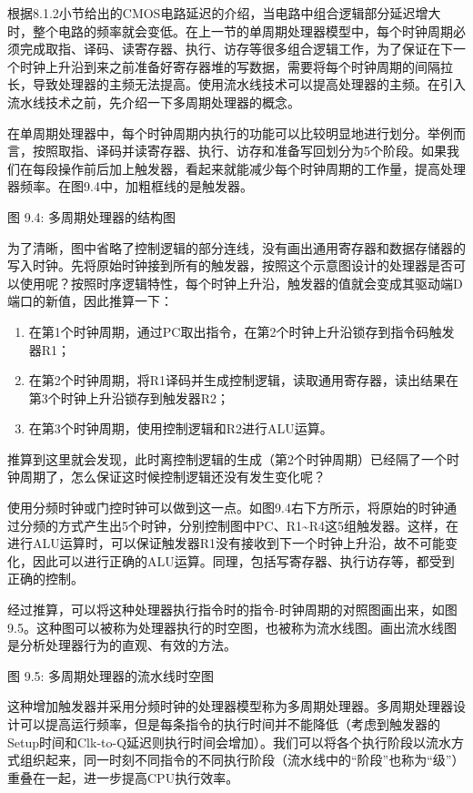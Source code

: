 \documentclass[]{ctexbook}
\providecommand{\tightlist}{%
  \setlength{\itemsep}{0pt}\setlength{\parskip}{0pt}}
\begin{document}
根据8.1.2小节给出的CMOS电路延迟的介绍，当电路中组合逻辑部分延迟增大时，整个电路的频率就会变低。在上一节的单周期处理器模型中，每个时钟周期必须完成取指、译码、读寄存器、执行、访存等很多组合逻辑工作，为了保证在下一个时钟上升沿到来之前准备好寄存器堆的写数据，需要将每个时钟周期的间隔拉长，导致处理器的主频无法提高。使用流水线技术可以提高处理器的主频。在引入流水线技术之前，先介绍一下多周期处理器的概念。

在单周期处理器中，每个时钟周期内执行的功能可以比较明显地进行划分。举例而言，按照取指、译码并读寄存器、执行、访存和准备写回划分为5个阶段。如果我们在每段操作前后加上触发器，看起来就能减少每个时钟周期的工作量，提高处理器频率。在图9.4中，加粗框线的是触发器。

图 9.4: 多周期处理器的结构图

为了清晰，图中省略了控制逻辑的部分连线，没有画出通用寄存器和数据存储器的写入时钟。先将原始时钟接到所有的触发器，按照这个示意图设计的处理器是否可以使用呢？按照时序逻辑特性，每个时钟上升沿，触发器的值就会变成其驱动端D端口的新值，因此推算一下：

\begin{enumerate}
\def\labelenumi{\arabic{enumi})}
\tightlist
\item
  在第1个时钟周期，通过PC取出指令，在第2个时钟上升沿锁存到指令码触发器R1；
\item
  在第2个时钟周期，将R1译码并生成控制逻辑，读取通用寄存器，读出结果在第3个时钟上升沿锁存到触发器R2；
\item
  在第3个时钟周期，使用控制逻辑和R2进行ALU运算。
\end{enumerate}

推算到这里就会发现，此时离控制逻辑的生成（第2个时钟周期）已经隔了一个时钟周期了，怎么保证这时候控制逻辑还没有发生变化呢？

使用分频时钟或门控时钟可以做到这一点。如图9.4右下方所示，将原始的时钟通过分频的方式产生出5个时钟，分别控制图中PC、R1\textasciitilde R4这5组触发器。这样，在进行ALU运算时，可以保证触发器R1没有接收到下一个时钟上升沿，故不可能变化，因此可以进行正确的ALU运算。同理，包括写寄存器、执行访存等，都受到正确的控制。

经过推算，可以将这种处理器执行指令时的指令-时钟周期的对照图画出来，如图9.5。这种图可以被称为处理器执行的时空图，也被称为流水线图。画出流水线图是分析处理器行为的直观、有效的方法。

图 9.5: 多周期处理器的流水线时空图

这种增加触发器并采用分频时钟的处理器模型称为多周期处理器。多周期处理器设计可以提高运行频率，但是每条指令的执行时间并不能降低（考虑到触发器的Setup时间和Clk-to-Q延迟则执行时间会增加）。我们可以将各个执行阶段以流水方式组织起来，同一时刻不同指令的不同执行阶段（流水线中的``阶段''也称为``级''）重叠在一起，进一步提高CPU执行效率。
\end{document}

